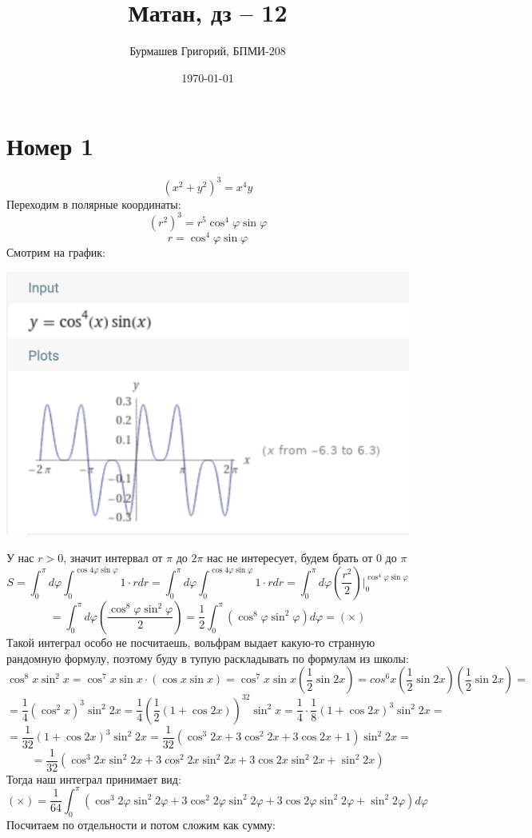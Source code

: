 \documentclass[a4paper,12pt]{article}
\author{Бурмашев Григорий, БПМИ-208}
\title{Матан, дз -- 12}
\date{\today}
\begin{document}
\maketitle 
\section*{Номер 1}
\[
(x^2 + y^2)^3 = x^4y
\]
Переходим в полярные координаты:
\[
(r^2)^3 = r^5 \cos^4 \varphi \sin \varphi
\]
\[
r = \cos^4 \varphi \sin \varphi 
\]
Смотрим на график:
\begin{center}
\includegraphics[scale=0.4]{1.png}
\end{center}
У нас $r > 0$, значит интервал от $\pi$ до $2\pi$ нас не интересует, будем брать от 0 до $\pi$
\[
S = \int_0^{\pi} d\varphi \int_0^{\cos4 \varphi \sin \varphi} 1\cdot  r dr =\int_0^{\pi} d\varphi \int_0^{\cos4 \varphi \sin \varphi} 1\cdot  r dr = \int_0^{\pi} d\varphi \left(\frac{r^2}{2}\right) \Bigg|^{{\cos^4 \varphi \sin \varphi}}_{0}
\]
\[
= \int_0^{\pi} d\varphi \left(\frac{\cos^8 \varphi \sin^2 \varphi }{2}\right) =  \frac{1}{2} \int_0^{\pi}  \left(\cos^8 \varphi \sin^2 \varphi\right)d\varphi = ( \times ) 
\]
 Такой интеграл особо не посчитаешь, вольфрам выдает какую-то странную  рандомную формулу, поэтому буду в тупую раскладывать по формулам из школы:
\[
\cos^8 x \sin^2 x = \cos^7 x \sin x \cdot (\cos x \sin x) = \cos^7 x \sin x  \left(\frac{1}{2}\sin2x\right) = cos^6x \left(\frac{1}{2}\sin2x\right) \left(\frac{1}{2}\sin2x\right) = 
\]
\[
=
\frac{1}{4}  (\cos^2 x)^3\sin^2 2x  = \frac{1}{4} \left(\frac{1}{2}(1 + \cos 2x)\right)^32 \sin^2 x = \frac{1}{4} \cdot \frac{1}{8} \left(1 + \cos2x \right)^3 \sin^2 2x = 
\]
\[
=
\frac{1}{32} (1 + \cos 2x)^3 \sin^2 2x = \frac{1}{32} \left(\cos^3 2x + 3\cos^2 2x +3 \cos 2x + 1 \right) \sin^2 2x = 
\]
\[
=
\frac{1}{32} \left(\cos^3 2x \sin^2 2x + 3\cos^2 2x \sin^2 2x + 3\cos 2x \sin^2 2 x + \sin^2 2x \right)
\]
Тогда наш интеграл принимает вид:
\[
(\times) =  \frac{1}{64} \int_0^{\pi} \left(\cos^3 2\varphi \sin^2 2\varphi + 3\cos^2 2 \varphi\sin^2 2 \varphi  + 3\cos 2 \varphi \sin^2 2 \varphi + \sin^2 2 \varphi \right) d \varphi 
\]
Посчитаем по отдельности и потом сложим как сумму:
\end{document}
